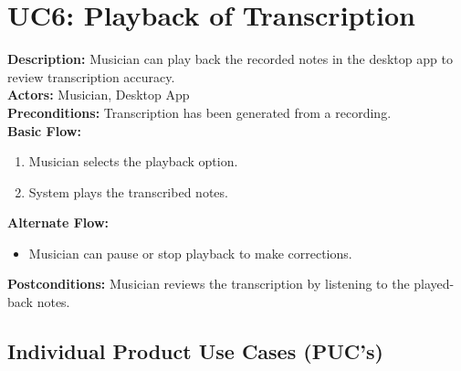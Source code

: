 \documentclass[12pt]{article}
\begin{document}
\section*{UC6: Playback of Transcription}
\textbf{Description:} Musician can play back the recorded notes in the desktop app to review transcription accuracy. \\
\textbf{Actors:} Musician, Desktop App \\
\textbf{Preconditions:} Transcription has been generated from a recording. \\
\textbf{Basic Flow:}
\begin{enumerate}
    \item Musician selects the playback option.
    \item System plays the transcribed notes.
\end{enumerate}
\textbf{Alternate Flow:}
\begin{itemize}
    \item Musician can pause or stop playback to make corrections.
\end{itemize}
\textbf{Postconditions:} Musician reviews the transcription by listening to the played-back notes.




\subsection{Individual Product Use Cases (PUC's)}
\end{document}
